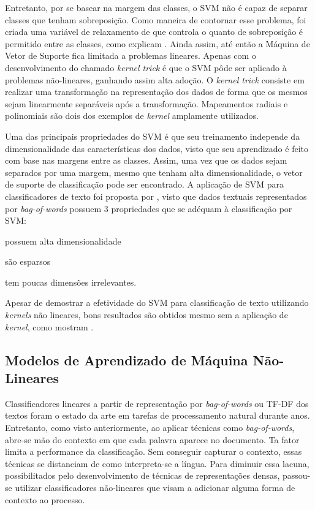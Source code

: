 Entretanto, por se basear na margem das classes, o SVM não é capaz de separar
classes que tenham sobreposição.
Como maneira de contornar esse problema, foi criada uma variável de relaxamento de
que controla o quanto de sobreposição é permitido entre as classes, como
explicam \citet{cortes95}.
Ainda assim, até então a Máquina de Vetor de Suporte fica limitada a problemas
lineares.
Apenas com o desenvolvimento do chamado \textit{kernel trick} é que o SVM pôde ser
aplicado à problemas não-lineares, ganhando assim alta adoção.
O \textit{kernel trick} consiste em realizar uma transformação na representação
dos dados de forma que os mesmos sejam linearmente separáveis após a
transformação.
Mapeamentos radiais e polinomiais são dois dos exemplos de \textit{kernel}
amplamente utilizados.

Uma das principais propriedades do SVM é que seu treinamento independe da
dimensionalidade das características dos dados, visto que seu aprendizado é feito
com base nas margens entre as classes.
Assim, uma vez que os dados sejam separados por uma margem, mesmo que tenham
alta dimensionalidade, o vetor de suporte de classificação pode ser encontrado.
A aplicação de SVM para classificadores de texto foi proposta por
\citet{joachims98}, visto que dados textuais representados por
\textit{bag-of-words} possuem 3 propriedades que se adéquam à classificação por
SVM:
\begin {enumerate*} [label=\itshape\alph*\upshape)]
    \item possuem alta dimensionalidade
    \item são esparsos
    \item tem poucas dimensões irrelevantes.
\end {enumerate*}
Apesar de \citet{joachims98} demostrar a efetividade do SVM para classificação
de texto utilizando \textit{kernels} não lineares, bons resultados são obtidos
mesmo sem a aplicação de \textit{kernel}, como mostram \citet{pang02}.

\subsection{Modelos de Aprendizado de Máquina Não-Lineares}

Classificadores lineares a partir de representação por \textit{bag-of-words} ou
TF-DF dos textos foram o estado da arte em tarefas de processamento natural
durante anos.
Entretanto, como visto anteriormente, ao aplicar técnicas como
\textit{bag-of-words}, abre-se mão do contexto em que cada palavra aparece no
documento.
Ta fator limita a performance da classificação.
Sem conseguir capturar o contexto, essas técnicas se distanciam de como
interpreta-se a língua.
Para diminuir essa lacuna, possibilitados pelo desenvolvimento de técnicas de
representações densas, passou-se utilizar classificadores não-lineares que
visam a adicionar alguma forma de contexto ao processo.

